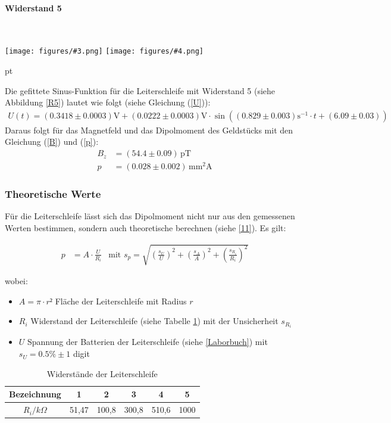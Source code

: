 \documentclass[12pt]{article}
\newcommand{\graTwoB}[5]{
	\begin{minipage}[h!]{\textwidth}
		\centering
		\texttt{[image: figures/\#3.png]}
		\texttt{[image: figures/\#4.png]}
		\captionof{figure}{#5}
	\end{minipage}
	\vskip 30 pt
}
\begin{document}
\paragraph{Widerstand 5}\ \\
\graTwoB{0.65}{0.34}{R5_Sinusfit}{R5_polar-plot}{Widerstand R5 \label{R5}}

Die gefittete Sinus-Funktion für die Leiterschleife mit Widerstand 5 (siehe Abbildung \ref{R5}) lautet wie folgt (siehe Gleichung (\ref{U})):
\begin{align*}
	U(t)=(0.3418\pm0.0003)\mathrm V+(0.0222\pm0.0003)\mathrm V\cdot \sin((0.829 \pm 0.003)\mathrm{s^{-1}}\cdot t + (6.09 \pm 0.03))
\end{align*}
Daraus folgt für das Magnetfeld und das Dipolmoment des Geldstücks mit den Gleichung (\ref{B}) und (\ref{p}):
\begin{align*}
	B_z&=(54.4 \pm 0.09)\,\mathrm{pT}\\
	p&=(0.028 \pm 0.002)\,\mathrm{mm^2A}
\end{align*}
\newpage
\subsubsection{Theoretische Werte}

Für die Leiterschleife lässt sich das Dipolmoment nicht nur aus den gemessenen Werten bestimmen, sondern auch theoretische berechnen (siehe \ref{11}). Es gilt:

\begin{align*}
p &= A \cdot \frac{U}{R_i} &\text{mit } s_p = \sqrt{\left( \frac{s_U}{U}\right)^2  + \left( \frac{s_A}{A} \right)^2 + \left( \frac{s_{R_i}}{R_i}\right)^2 } 
\end{align*}

wobei:

\begin{itemize}
\item $A = \pi \cdot r² $ Fläche der Leiterschleife mit Radius $r$
\item $R_i$ Widerstand der Leiterschleife (siehe Tabelle \ref{Tab}) mit der Unsicherheit $s_{R_i}$
\item$U$ Spannung der Batterien der Leiterschleife (siehe \ref{Laborbuch}) mit $s_U = 0.5 \% \pm 1$ digit
\end{itemize}

\begin{table}[h!]
	\centering
	\begin{tabular}{c|c|c|c|c|c}
	Bezeichnung& 1& 2& 3& 4& 5 \\ \hline
	$R_i/k \Omega$ & 51,47&	100,8& 300,8 & 510,6 & 1000\\ 
	\end{tabular} 
\caption{Widerstände der Leiterschleife}	\label{Tab}
\end{table}
\end{document}
